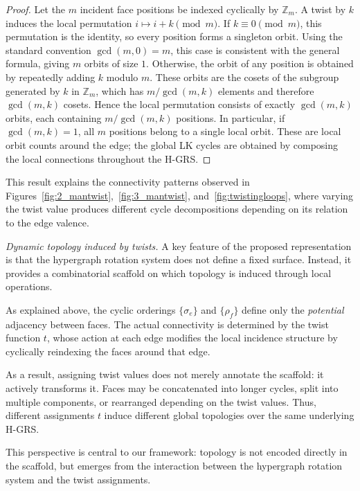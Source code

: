\documentclass[acmtog]{acmart}
\begin{document}
\begin{proof}
Let the $m$ incident face positions be indexed cyclically by $\mathbb{Z}_m$. A twist by $k$ induces the local permutation $i\mapsto i+k \pmod m$. If $k\equiv 0\pmod m$, this permutation is the identity, so every position forms a singleton orbit. Using the standard convention $\gcd(m,0)=m$, this case is consistent with the general formula, giving $m$ orbits of size $1$. Otherwise, the orbit of any position is obtained by repeatedly adding $k$ modulo $m$. These orbits are the cosets of the subgroup generated by $k$ in $\mathbb{Z}_m$, which has $m/\gcd(m,k)$ elements and therefore $\gcd(m,k)$ cosets. Hence the local permutation consists of exactly $\gcd(m,k)$ orbits, each containing $m/\gcd(m,k)$ positions. In particular, if $\gcd(m,k)=1$, all $m$ positions belong to a single local orbit. These are local orbit counts around the edge; the global LK cycles are obtained by composing the local connections throughout the H-GRS.
\end{proof}







This result explains the connectivity patterns observed in Figures~\ref{fig:2_mantwist},~\ref{fig:3_mantwist}, and~\ref{fig:twistingloops}, where varying the twist value produces different cycle decompositions depending on its relation to the edge valence.

\textit{Dynamic topology induced by twists.}
A key feature of the proposed representation is that the hypergraph rotation system does not define a fixed surface. Instead, it provides
a combinatorial scaffold on which topology is induced through local operations.

As explained above, the cyclic orderings $\{\sigma_e\}$ and $\{\rho_f\}$ define only the
\emph{potential} adjacency between faces. The actual connectivity is determined by the twist function $t$, whose action at each edge modifies
the local incidence structure by cyclically reindexing the faces around that edge.

As a result, assigning twist values does not merely annotate the scaffold: it actively transforms it. Faces may be concatenated into longer cycles,
split into multiple components, or rearranged depending on the twist
values. Thus, different assignments $t$ induce different global
topologies over the same underlying H-GRS.

This perspective is central to our framework: topology is not encoded
directly in the scaffold, but emerges from the interaction between the
hypergraph rotation system and the twist assignments.
\end{document}
